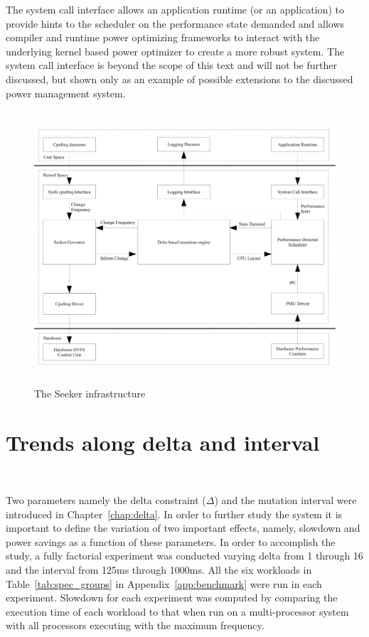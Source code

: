 The system call interface allows an application runtime (or an application) to provide hints to the scheduler
on the performance state demanded and allows compiler and runtime power optimizing frameworks to interact with the underlying
kernel based power optimizer to create a more robust system. The system call interface is beyond the scope 
of this text and will not be further discussed, but shown only as an example of possible extensions to the 
discussed power management system.

\begin{figure}[h!]
  \begin{center}
    \includegraphics[height=4in]{figures/seeker.jpg}
    \caption{The Seeker infrastructure}
    \label{fig:entire_seeker}
  \end{center}
\end{figure}

\section{Trends along delta and interval}~\label{sec:trends}

Two parameters namely the delta constraint ($\Delta$) and the mutation interval 
were introduced in Chapter~\ref{chap:delta}. In order to further study the system
it is important to define the variation of two important effects,
namely, slowdown and power savings as a function of these parameters. In order
to accomplish the study, a fully factorial experiment was conducted varying delta 
from 1 through 16 and the interval from 125ms through 1000ms. All the six workloads in 
Table~\ref{tab:spec_groups} in Appendix~\ref{app:benchmark} were run in each 
experiment. Slowdown for each experiment was computed by comparing the execution time of each workload 
to that when run on a multi-processor system with all processors executing with the maximum frequency.


